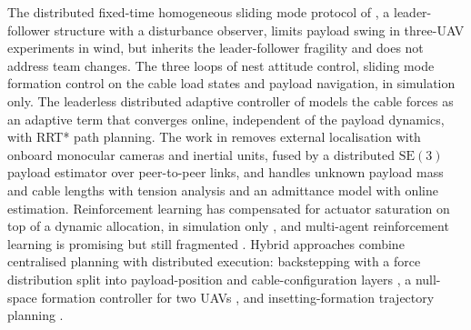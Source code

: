 The distributed fixed-time homogeneous sliding mode protocol of \cite{DFHSMC}, a leader-follower structure with a
disturbance observer, limits payload swing in three-UAV experiments in wind, but inherits the leader-follower
fragility and does not address team changes. The three loops of \cite{kotaruDynamicsControlQuadrotor2017} nest
attitude control, sliding mode formation control on the cable load states and payload navigation, in simulation
only. The leaderless distributed adaptive controller of \cite{arabPlanningDistributedControl2021} models the cable
forces as an adaptive term that converges online, independent of the payload dynamics, with RRT* path planning.
The work in \cite{9376103} removes external localisation with onboard monocular cameras and inertial units, fused
by a distributed $\text{SE}(3)$ payload estimator over peer-to-peer links, and \cite{10144367} handles unknown
payload mass and cable lengths with tension analysis and an admittance model with online estimation.
Reinforcement learning has compensated for actuator saturation on top of a dynamic allocation, in simulation only
\cite{liMultiUAVCooperativeTransportation2021}, and multi-agent reinforcement learning is promising but still
fragmented \cite{ekechiSurveyUAVControl2025}. Hybrid approaches combine centralised planning with distributed
execution: backstepping with a force distribution split into payload-position and cable-configuration layers
\cite{wangRobustCooperativeTransportation2024}, a null-space formation controller for two UAVs
\cite{gimenezMultiobjectiveControlCooperative2018}, and insetting-formation trajectory planning
\cite{zhangIFBasedTrajectoryPlanning2023}.

